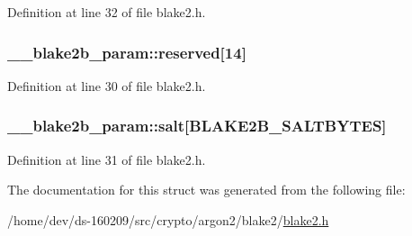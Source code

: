 Definition at line 32 of file blake2.\+h.

\hypertarget{struct____blake2b__param_a03f80ec4887f254dabe4baa9626fd5ab}{}
\subsubsection[{reserved}]{ \+\_\+\+\_\+blake2b\+\_\+param\+::reserved\mbox{[}14\mbox{]}}\label{struct____blake2b__param_a03f80ec4887f254dabe4baa9626fd5ab}


Definition at line 30 of file blake2.\+h.

\hypertarget{struct____blake2b__param_ad53420f1ce170abad76166fe101a46b5}{}
\subsubsection[{salt}]{ \+\_\+\+\_\+blake2b\+\_\+param\+::salt\mbox{[}{\bf B\+L\+A\+K\+E2\+B\+\_\+\+S\+A\+L\+T\+B\+Y\+T\+E\+S}\mbox{]}}\label{struct____blake2b__param_ad53420f1ce170abad76166fe101a46b5}


Definition at line 31 of file blake2.\+h.



The documentation for this struct was generated from the following file\+:\begin{DoxyCompactItemize}
\item 
/home/dev/ds-\/160209/src/crypto/argon2/blake2/\hyperlink{blake2_8h}{blake2.\+h}\end{DoxyCompactItemize}
